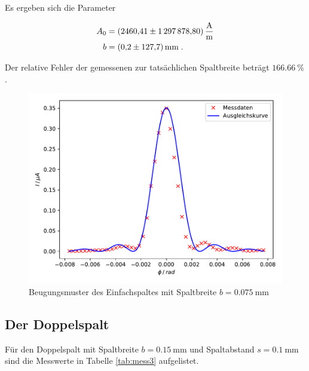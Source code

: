 Es ergeben sich die Parameter 

\begin{align*}
    A_0 &= \SI{2460.41 +- 1297878.80}{\ampere\per\meter} \\
    b &= \SI{0.2 +- 127.7}{\milli\meter} \; .
\end{align*}

Der relative Fehler der gemessenen zur tatsächlichen Spaltbreite beträgt $\SI{166.66}{\percent}$.

\begin{figure}
    \centering
    \includegraphics{content/plot2.pdf}
    \caption{Beugungsmuster des Einfachspaltes mit Spaltbreite $b = \SI{0.075}{\milli\meter}$}
    \label{fig:plot2}
  \end{figure}



\subsection{Der Doppelspalt}

Für den Doppelspalt mit Spaltbreite $b = \SI{0.15}{\milli\meter}$ und Spaltabstand
$s = \SI{0.1}{\milli\meter}$ sind die Messwerte in Tabelle \ref{tab:mess3} aufgelistet.


